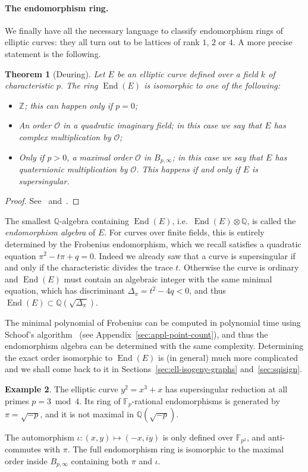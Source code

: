 \documentclass[10pt]{article}
\theoremstyle{plain}
\newtheorem{theorem}{Theorem}
\theoremstyle{definition}
\newtheorem{example}[theorem]{Example}
\DeclareMathOperator{\End}{End} %
\def\F{\ensuremath{\mathbb{F}}}
\def\O{\ensuremath{\mathcal{O}}}
\begin{document}
\paragraph{The endomorphism ring.}
We finally have all the necessary language to classify endomorphism
rings of elliptic curves: they all turn out to be lattices of
rank $1$, $2$ or $4$. A more precise statement is the following.

\begin{theorem}[Deuring]
  Let $E$ be an elliptic curve defined over a field $k$ of
  characteristic $p$. %
  The ring $\End(E)$ is isomorphic to one of the following:
  \begin{itemize}
  \item $ℤ$; this can happen only if $p=0$;
  \item An order $\O$ in a quadratic imaginary field; in this case we
    say that $E$ has \emph{complex multiplication} by $\O$;
  \item Only if $p>0$, a maximal order $\O$ in $B_{p,\infty}$; in this
    case we say that $E$ has \emph{quaternionic multiplication} by
    $\O$. %
    This happens if and only if $E$ is supersingular.
  \end{itemize}
\end{theorem}
\begin{proof}
  See~\cite[III, Coro.~9.4]{silverman:elliptic}
  and~\cite{kohel}.
\end{proof}

The smallest $ℚ$-algebra containing $\End(E)$, i.e.\ $\End(E)⊗ℚ$, is
called the \emph{endomorphism algebra} of $E$. %
For curves over finite fields, this is entirely determined by the
Frobenius endomorphism, which we recall satisfies a quadratic equation
$π^2 - tπ + q = 0$. %
Indeed we already saw that a curve is supersingular if and only if the
characteristic divides the trace $t$. %
Otherwise the curve is ordinary and $\End(E)$ must contain an
algebraic integer with the same minimal equation, which has
discriminant $Δ_π=t^2-4q<0$, and thus $\End(E)⊂ℚ(\sqrt{Δ_π})$.

The minimal polynomial of Frobenius can be computed in polynomial time
using Schoof's algorithm~\cite{schoof85} (see
Appendix~\ref{sec:appl-point-count}), and thus the endomorphism
algebra can be determined with the same complexity.
Determining the exact order isomorphic to $\End(E)$ is (in general)
much more complicated and we shall come back to it in
Sections~\ref{sec:ell-isogeny-graphs} and~\ref{sec:sqisign}.

\begin{example}
  The elliptic curve $y^2=x^3+x$ has supersingular reduction at all
  primes $p=3\bmod 4$. %
  Its ring of $\F_p$-rational endomorphisms is generated by
  $π=\sqrt{-p}$, and it is not maximal in $ℚ(\sqrt{-p})$.

  The automorphism $ι:(x,y)↦(-x,iy)$ is only defined over $\F_{p^2}$,
  and anti-commutes with $π$. %
  The full endomorphism ring is isomorphic to the maximal order inside
  $B_{p,∞}$ containing both $π$ and $ι$.
\end{example}
\end{document}
